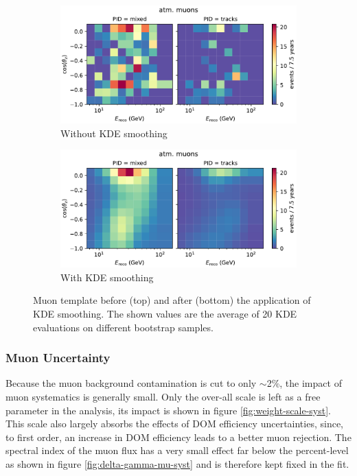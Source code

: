 \begin{figure}[H] 
    \centering
    \begin{subfigure}{0.8\textwidth}
        \centering
        \includegraphics[width=\textwidth,trim={0 0 0 0.6cm},clip]{figures/measurement/systematics/muons/muon_hist_no_kde.pdf}
        \caption{Without KDE smoothing}
        \label{fig:muon-template-no-kde}
    \end{subfigure}
    \begin{subfigure}{0.8\textwidth}
        \centering
        \includegraphics[width=\textwidth,trim={0 0 0 0.6cm},clip]{figures/measurement/systematics/muons/plot_maps_muon.pdf}
        \caption{With KDE smoothing}
        \label{fig:muon-template-with-kde}
    \end{subfigure}
    
    \caption{Muon template before (top) and after (bottom) the application of KDE smoothing. The shown values are the average of 20 KDE evaluations on different bootstrap samples.}
    \label{fig:muon-kde-smoothing}
\end{figure}

\subsubsection{Muon Uncertainty}
\label{sec:atm-muons-systematic}
Because the muon background contamination is cut to only $\sim$2\%, the impact of muon systematics is generally small. Only the over-all scale is left as a free parameter in the analysis, its impact is shown in figure \ref{fig:weight-scale-syst}. This scale also largely absorbs the effects of DOM efficiency uncertainties, since, to first order, an increase in DOM efficiency leads to a better muon rejection. The spectral index of the muon flux has a very small effect far below the percent-level as shown in figure \ref{fig:delta-gamma-mu-syst} and is therefore kept fixed in the fit.

